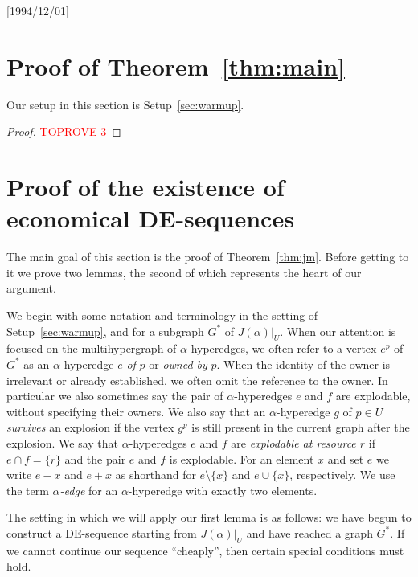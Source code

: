 \NeedsTeXFormat{LaTeX2e}[1994/12/01]\documentclass[letterpaper, 11pt]{article}
\theoremstyle{definition}
\theoremstyle{remark}
\numberwithin{equation}{section}
\begin{document}
    
\section{Proof of Theorem~\ref{thm:main}} \label{sec:mainproof}
 
Our setup in this section is Setup~\ref{sec:warmup}.

\begin{proof}\textcolor{red}{TOPROVE 3}\end{proof}

\section{Proof of the existence of economical
  DE-sequences} \label{sec:proofs}


The main goal of this section is the proof of
Theorem~\ref{thm:jm}. Before getting to it we prove two lemmas, the
second of which represents the heart of our argument.  
  
We begin with some notation and terminology in the setting of
Setup~\ref{sec:warmup}, and for a subgraph  $G^*$ of $J(\alpha)|_U$.
When our attention is focused on the multihypergraph of
$\alpha$-hyperedges, we often refer to a vertex $e^p$ of $G^*$ as an
$\alpha$-hyperedge $e$ {\em of} $p$ or {\em owned by} $p$. When the identity of
the owner is irrelevant or already established, we often omit the
reference to the owner. In particular we also sometimes say the pair
of $\alpha$-hyperedges $e$ and $f$ are explodable, without specifying
their owners.
We also say that an $\alpha$-hyperedge $g$ of $p\in U$ {\em survives} an
explosion if the vertex $g^p$ is still present in the current graph
after the explosion. 
We say that $\alpha$-hyperedges $e$ and $f$ are {\em explodable at resource
$r$} if $e\cap f = \{ r \}$ and the pair $e$ and $f$ is explodable. 
For an element $x$ and set $e$ we write $e-x$ and
$e+x$ as shorthand for $e\setminus\{x\}$ and $e\cup\{x\}$, respectively.
We use the term {\it $\alpha$-edge} for an $\alpha$-hyperedge with
exactly two elements.

The setting in which we will apply our first lemma is as
  follows: we have begun to construct a DE-sequence starting from
  $J(\alpha)|_U$ and have reached a graph $G^*$. If we cannot continue
  our sequence ``cheaply'', then certain special conditions must hold.
\end{document}
